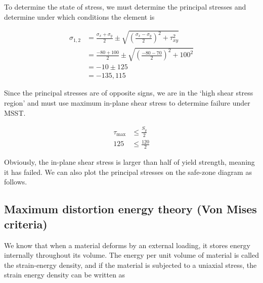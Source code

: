\documentclass[
10pt,
a4paper,
openany,
svgnames,
]{book}
\begin{document}
\begin{solution}
  To determine the state of stress, we must determine the principal stresses and determine under which conditions the element is

  \begin{align*}
    \sigma_{1,2} &= \frac{\sigma_x + \sigma_y}{2} \pm \sqrt{ \left( \frac{\sigma_x - \sigma_y}{2} \right)^2 + \tau_{xy}^2 } \\
                 &= \frac{-80 + 100}{2} \pm \sqrt{ \left( \frac{-80 - 70}{2} \right)^2 + 100^2 } \\
                 &= -10 \pm 125 \\
                 &= -135, 115
  \end{align*}

  Since the principal stresses are of opposite signs, we are in the `high shear stress region' and must use maximum in-plane shear stress to determine failure under MSST.

  \begin{align*}
    \tau_{\max} &\leqslant \frac{S_y}{2} \\
    125 &\leqslant \frac{120}{2}
  \end{align*}

  Obviously, the in-plane shear stress is larger than half of yield strength, meaning it has failed. We can also plot the principal stresses on the safe-zone diagram as follows.

  \begin{figure}[H]
    \centering
  \end{figure}
\end{solution}

\subsection{Maximum distortion energy theory (Von Mises criteria)}

We know that when a material deforms by an external loading, it stores energy internally throughout its volume. The energy per unit volume of material is called the strain-energy density, and if the material is subjected to a uniaxial stress, the strain energy density can be written as
\end{document}
